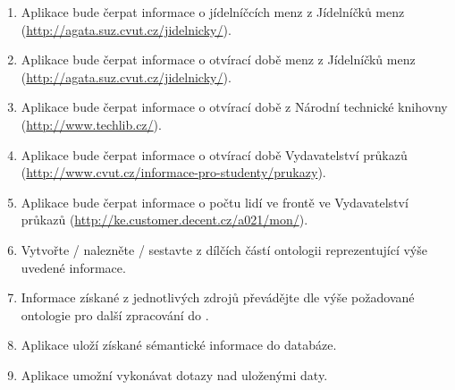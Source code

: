 \begin{enumerate}
 \item Aplikace bude čerpat informace o jídelníčcích menz z Jídelníčků menz (\url{http://agata.suz.cvut.cz/jidelnicky/}).
 \item Aplikace bude čerpat informace o otvírací době menz z Jídelníčků menz (\url{http://agata.suz.cvut.cz/jidelnicky/}).
 \item Aplikace bude čerpat informace o otvírací době  z Národní technické knihovny (\url{http://www.techlib.cz/}).
 \item Aplikace bude čerpat informace o otvírací době Vydavatelství průkazů (\url{http://www.cvut.cz/informace-pro-studenty/prukazy}). 
 \item Aplikace bude čerpat informace o počtu lidí ve frontě ve Vydavatelství průkazů (\url{http://ke.customer.decent.cz/a021/mon/}).
 \item Vytvořte / nalezněte / sestavte z dílčích částí ontologii reprezentující výše uvedené informace.
 \item Informace získané z jednotlivých zdrojů převádějte dle výše požadované ontologie pro další zpracování do .
 \item Aplikace uloží získané sémantické informace do databáze.
 \item Aplikace umožní vykonávat  dotazy nad uloženými daty.
\end{enumerate}

